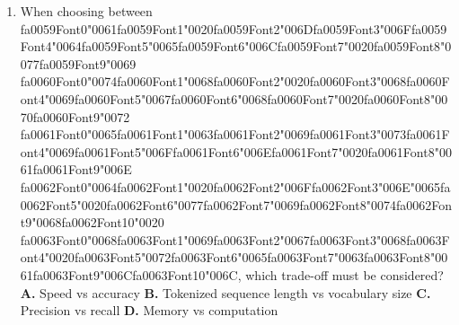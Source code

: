 \documentclass[11pt]{article}
\begin{document}
\begin{enumerate}[leftmargin=*]
    \textbf{A.} It cannot represent overlapping or nested entities
    \textbf{B.} It requires too many labels
    \textbf{C.} It does not support multiple entity types
    \textbf{D.} It ignores entity boundaries

  \item When choosing between {\csname fa0059Font0\endcsname\char"0061}{\csname fa0059Font1\endcsname\char"0020}{\csname fa0059Font2\endcsname\char"006D}{\csname fa0059Font3\endcsname\char"006F}{\csname fa0059Font4\endcsname\char"0064}{\csname fa0059Font5\endcsname\char"0065}{\csname fa0059Font6\endcsname\char"006C}{\csname fa0059Font7\endcsname\char"0020}{\csname fa0059Font8\endcsname\char"0077}{\csname fa0059Font9\endcsname\char"0069} {\csname fa0060Font0\endcsname\char"0074}{\csname fa0060Font1\endcsname\char"0068}{\csname fa0060Font2\endcsname\char"0020}{\csname fa0060Font3\endcsname\char"0068}{\csname fa0060Font4\endcsname\char"0069}{\csname fa0060Font5\endcsname\char"0067}{\csname fa0060Font6\endcsname\char"0068}{\csname fa0060Font7\endcsname\char"0020}{\csname fa0060Font8\endcsname\char"0070}{\csname fa0060Font9\endcsname\char"0072} {\csname fa0061Font0\endcsname\char"0065}{\csname fa0061Font1\endcsname\char"0063}{\csname fa0061Font2\endcsname\char"0069}{\csname fa0061Font3\endcsname\char"0073}{\csname fa0061Font4\endcsname\char"0069}{\csname fa0061Font5\endcsname\char"006F}{\csname fa0061Font6\endcsname\char"006E}{\csname fa0061Font7\endcsname\char"0020}{\csname fa0061Font8\endcsname\char"0061}{\csname fa0061Font9\endcsname\char"006E} {\csname fa0062Font0\endcsname\char"0064}{\csname fa0062Font1\endcsname\char"0020}{\csname fa0062Font2\endcsname\char"006F}{\csname fa0062Font3\endcsname\char"006E}{\char"0065}{\csname fa0062Font5\endcsname\char"0020}{\csname fa0062Font6\endcsname\char"0077}{\csname fa0062Font7\endcsname\char"0069}{\csname fa0062Font8\endcsname\char"0074}{\csname fa0062Font9\endcsname\char"0068}{\csname fa0062Font10\endcsname\char"0020} {\csname fa0063Font0\endcsname\char"0068}{\csname fa0063Font1\endcsname\char"0069}{\csname fa0063Font2\endcsname\char"0067}{\csname fa0063Font3\endcsname\char"0068}{\csname fa0063Font4\endcsname\char"0020}{\csname fa0063Font5\endcsname\char"0072}{\csname fa0063Font6\endcsname\char"0065}{\csname fa0063Font7\endcsname\char"0063}{\csname fa0063Font8\endcsname\char"0061}{\csname fa0063Font9\endcsname\char"006C}{\csname fa0063Font10\endcsname\char"006C}, which trade-off must be considered?
    \textbf{A.} Speed vs accuracy
    \textbf{B.} Tokenized sequence length vs vocabulary size
    \textbf{C.} Precision vs recall
    \textbf{D.} Memory vs computation

\end{enumerate}
\end{document}
